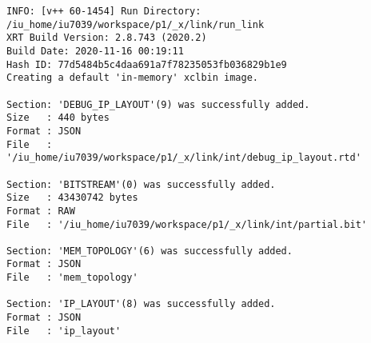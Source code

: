 \begin{lstlisting}[label=lst:lev_rec,caption=Содержимое log-файла]
INFO: [v++ 60-1454] Run Directory: /iu_home/iu7039/workspace/p1/_x/link/run_link
XRT Build Version: 2.8.743 (2020.2)
Build Date: 2020-11-16 00:19:11
Hash ID: 77d5484b5c4daa691a7f78235053fb036829b1e9
Creating a default 'in-memory' xclbin image.

Section: 'DEBUG_IP_LAYOUT'(9) was successfully added.
Size   : 440 bytes
Format : JSON
File   : '/iu_home/iu7039/workspace/p1/_x/link/int/debug_ip_layout.rtd'

Section: 'BITSTREAM'(0) was successfully added.
Size   : 43430742 bytes
Format : RAW
File   : '/iu_home/iu7039/workspace/p1/_x/link/int/partial.bit'

Section: 'MEM_TOPOLOGY'(6) was successfully added.
Format : JSON
File   : 'mem_topology'

Section: 'IP_LAYOUT'(8) was successfully added.
Format : JSON
File   : 'ip_layout'


\end{lstlisting}

